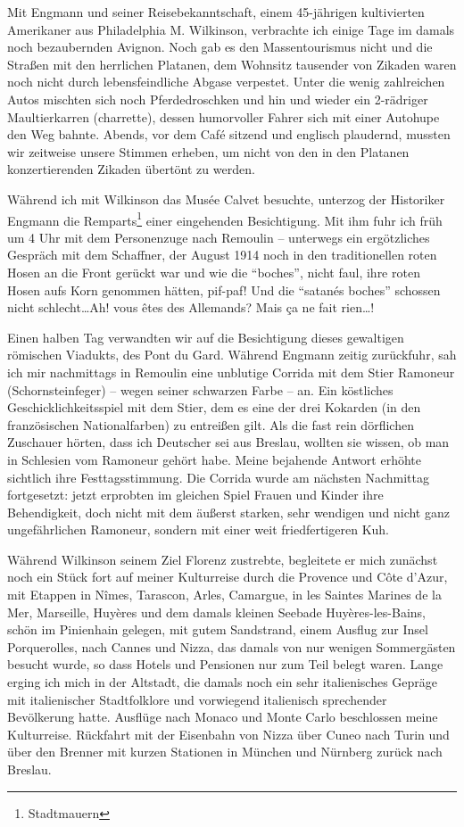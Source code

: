 \documentclass[a5paper,pagesize,10pt,twoside=true]{scrbook}
\begin{document}
Mit Engmann und seiner Reisebekanntschaft, einem 45-jährigen kultivierten Amerikaner aus Philadelphia M. Wilkinson, verbrachte ich einige Tage im damals noch bezaubernden Avignon. Noch gab es den Massentourismus nicht und die Straßen mit den herrlichen Platanen, dem Wohnsitz tausender von Zikaden waren noch nicht durch lebensfeindliche Abgase verpestet. Unter die wenig zahlreichen Autos mischten sich noch Pferdedroschken und hin und wieder ein 2-rädriger Maultierkarren (charrette), dessen humorvoller Fahrer sich mit einer Autohupe den Weg bahnte. Abends, vor dem Café sitzend und englisch plaudernd, mussten wir zeitweise unsere Stimmen erheben, um nicht von den in den Platanen konzertierenden Zikaden übertönt zu werden.

Während ich mit Wilkinson das Musée Calvet besuchte, unterzog der Historiker Engmann die Remparts\footnote{Stadtmauern} einer eingehenden Besichtigung. Mit ihm fuhr ich früh um 4 Uhr mit dem Personenzuge nach Remoulin -- unterwegs ein ergötzliches Gespräch mit dem Schaffner, der August 1914 noch in den traditionellen roten Hosen an die Front gerückt war und wie die \enquote{boches}, nicht faul, ihre roten Hosen aufs Korn genommen hätten, pif-paf! Und die \enquote{satanés boches} schossen nicht schlecht\dots Ah! vous êtes des Allemands? Mais ça ne fait rien\dots!

Einen halben Tag verwandten wir auf die Besichtigung dieses gewaltigen römischen Viadukts, des Pont du Gard. Während Engmann zeitig zurückfuhr, sah ich mir nachmittags in Remoulin eine unblutige Corrida mit dem Stier Ramoneur (Schornsteinfeger) -- wegen seiner schwarzen Farbe -- an. Ein köstliches Geschicklichkeitsspiel mit dem Stier, dem es eine der drei Kokarden (in den französischen Nationalfarben) zu entreißen gilt. Als die fast rein dörflichen Zuschauer hörten, dass ich Deutscher sei aus Breslau, wollten sie wissen, ob man in Schlesien vom Ramoneur gehört habe. Meine bejahende Antwort erhöhte sichtlich ihre Festtagsstimmung. Die Corrida wurde am nächsten Nachmittag fortgesetzt: jetzt erprobten im gleichen Spiel Frauen und Kinder ihre Behendigkeit, doch nicht mit dem äußerst starken, sehr wendigen und nicht ganz ungefährlichen Ramoneur, sondern mit einer weit friedfertigeren Kuh.

Während Wilkinson seinem Ziel Florenz zustrebte, begleitete er mich zunächst noch ein Stück fort auf meiner Kulturreise durch die Provence und Côte d'Azur, mit Etappen in Nîmes, Tarascon, Arles, Camargue, in les Saintes Marines de la Mer, Marseille, Huyères und dem damals kleinen Seebade Huyères-les-Bains, schön im Pinienhain gelegen, mit gutem Sandstrand, einem Ausflug zur Insel Porquerolles, nach Cannes und Nizza, das damals von nur wenigen Sommergästen besucht wurde, so dass Hotels und Pensionen nur zum Teil belegt waren. Lange erging ich mich in der Altstadt, die damals noch ein sehr italienisches Gepräge mit italienischer Stadtfolklore und vorwiegend italienisch sprechender Bevölkerung hatte. Ausflüge nach Monaco und Monte Carlo beschlossen meine Kulturreise. Rückfahrt mit der Eisenbahn von Nizza über Cuneo nach Turin und über den Brenner mit kurzen Stationen in München und Nürnberg zurück nach Breslau.\\
\end{document}
